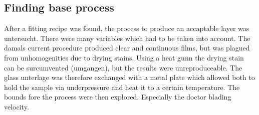 \documentclass[a4paper]{article}
\begin{document}
\subsection{Finding base process}
After a fitting recipe was found, the process to produce an accaptable layer was untersucht. 
There were many variables which had to be taken into account. 
The damals current procedure produced clear and continuous films, but was plagued from unhomogenities due to drying stains. 
Using a heat gunn the drying stain can be surcumvented (umgangen), but the results were unreproduceable. 
The glass unterlage was therefore exchanged with a metal plate which allowed both to hold the sample via underpressure and heat it to a certain temperature.
The bounds fore the process were then explored. 
Especially the doctor blading velocity.




\iffalse
\end{document}
